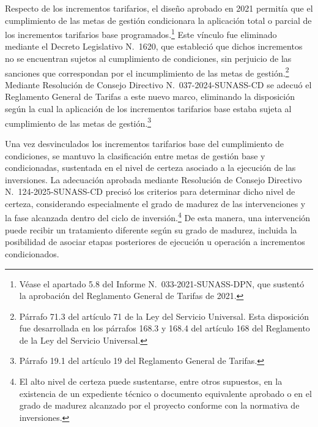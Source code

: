 Respecto de los incrementos tarifarios, el diseño aprobado en 2021 permitía que el cumplimiento de las metas de gestión condicionara la aplicación total o parcial de los incrementos tarifarios base programados.\footnote{Véase el apartado 5.8 del Informe N.\textdegree~033-2021-SUNASS-DPN, que sustentó la aprobación del Reglamento General de Tarifas de 2021.} Este vínculo fue eliminado mediante el Decreto Legislativo N.\textdegree~1620, que estableció que dichos incrementos no se encuentran sujetos al cumplimiento de condiciones, sin perjuicio de las sanciones que correspondan por el incumplimiento de las metas de gestión.\footnote{Párrafo 71.3 del artículo 71 de la Ley del Servicio Universal. Esta disposición fue desarrollada en los párrafos 168.3 y 168.4 del artículo 168 del Reglamento de la Ley del Servicio Universal.} Mediante Resolución de Consejo Directivo N.\textdegree~037-2024-SUNASS-CD se adecuó el Reglamento General de Tarifas a este nuevo marco, eliminando la disposición según la cual la aplicación de los incrementos tarifarios base estaba sujeta al cumplimiento de las metas de gestión.\footnote{Párrafo 19.1 del artículo 19 del Reglamento General de Tarifas.}

Una vez desvinculados los incrementos tarifarios base del cumplimiento de condiciones, se mantuvo la clasificación entre metas de gestión base y condicionadas, sustentada en el nivel de certeza asociado a la ejecución de las inversiones. La adecuación aprobada mediante Resolución de Consejo Directivo N.\textdegree~124-2025-SUNASS-CD precisó los criterios para determinar dicho nivel de certeza, considerando especialmente el grado de madurez de las intervenciones y la fase alcanzada dentro del ciclo de inversión.\footnote{El alto nivel de certeza puede sustentarse, entre otros supuestos, en la existencia de un expediente técnico o documento equivalente aprobado o en el grado de madurez alcanzado por el proyecto conforme con la normativa de inversiones.} De esta manera, una intervención puede recibir un tratamiento diferente según su grado de madurez, incluida la posibilidad de asociar etapas posteriores de ejecución u operación a incrementos condicionados.

